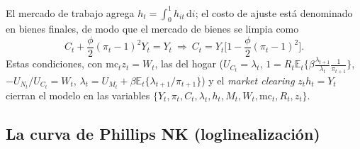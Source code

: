 \documentclass[11pt]{article}
\theoremstyle{definition}
\newcommand{\E}{\mathbb{E}}
\newcommand{\dd}{\,\mathrm{d}}
\newcommand{\mc}{\mathrm{mc}}
\begin{document}
El mercado de trabajo agrega $h_{t}=\int_{0}^{1}h_{it}\dd i$; el costo de ajuste está denominado en
bienes finales, de modo que el mercado de bienes se limpia como
\begin{equation}
C_{t}+\frac{\phi}{2}(\pi_{t}-1)^{2}Y_{t}=Y_{t}
\ \Longrightarrow\
C_{t}=Y_{t}\Big[1-\frac{\phi}{2}(\pi_{t}-1)^{2}\Big].
\end{equation}
Estas condiciones, con $\mc_{t}z_{t}=W_{t}$, las del hogar
($U_{C_{t}}=\lambda_{t}$, $1=R_{t}\E_{t}\{\beta\tfrac{\lambda_{t+1}}{\lambda_{t}}\tfrac{1}{\pi_{t+1}}\}$,
$-U_{N_{t}}/U_{C_{t}}=W_{t}$, $\lambda_{t}=U_{M_{t}}+\beta\E_{t}\{\lambda_{t+1}/\pi_{t+1}\}$) y el
\emph{market clearing} $z_{t}h_{t}=Y_{t}$ cierran el modelo en las variables
$\{Y_{t},\pi_{t},C_{t},\lambda_{t},h_{t},M_{t},W_{t},\mc_{t},R_{t},z_{t}\}$.

\subsection{La curva de Phillips NK (loglinealización)}
\end{document}
